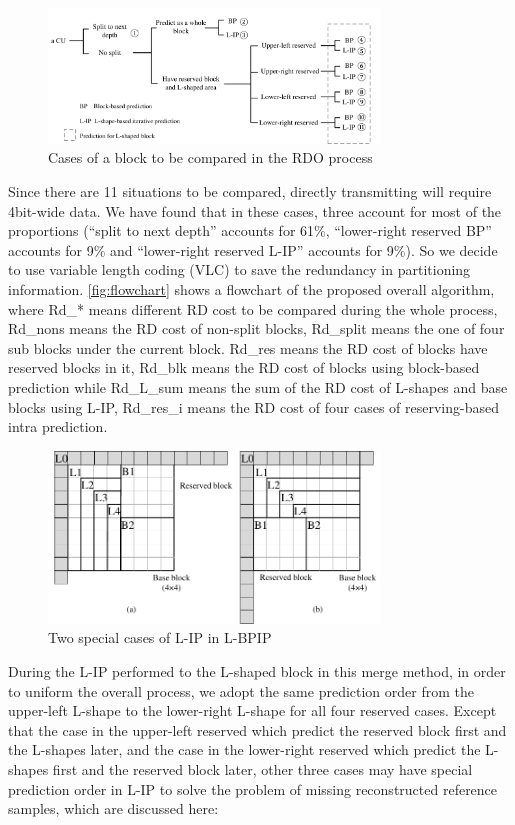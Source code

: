 \documentclass[journal]{IEEEtran}
\begin{document}
\begin{figure}[tp]
    \centering
    \includegraphics[width=8.8cm]{pictures/eleven cases.pdf}
    \caption{Cases of a block to be compared in the RDO process}
    \label{fig:eleven}
\end{figure}

Since there are 11 situations to be compared, directly transmitting will require 4bit-wide data. We have found that in these cases, three account for most of the proportions (``split to next depth'' accounts for 61\%, ``lower-right reserved BP'' accounts for 9\% and ``lower-right reserved L-IP'' accounts for 9\%). So we decide to use variable length coding (VLC) to save the redundancy in partitioning information. \autoref{fig:flowchart} shows a flowchart of the proposed overall algorithm, where Rd\_* means different RD cost to be compared during the whole process, Rd\_nons means the RD cost of non-split blocks, Rd\_split means the one of four sub blocks under the current block. Rd\_res means the RD cost of blocks have reserved blocks in it, Rd\_blk means the RD cost of blocks using block-based prediction while Rd\_L\_sum means the sum of the RD cost of L-shapes and base blocks using L-IP, Rd\_res\_i means the RD cost of four cases of reserving-based intra prediction.

\begin{figure}[tp]
    \centering
    \includegraphics[width=8.8cm]{pictures/special.pdf}
    \caption{Two special cases of L-IP in L-BPIP}
    \label{fig:special}
\end{figure}

During the L-IP performed to the L-shaped block in this merge method, in order to uniform the overall process, we adopt the same prediction order from the upper-left L-shape to the lower-right L-shape for all four reserved cases. Except that the case in the upper-left reserved which predict the reserved block first and the L-shapes later, and the case in the lower-right reserved which predict the L-shapes first and the reserved block later, other three cases may have special prediction order in L-IP to solve the problem of missing reconstructed reference samples, which are discussed here:
\end{document}
